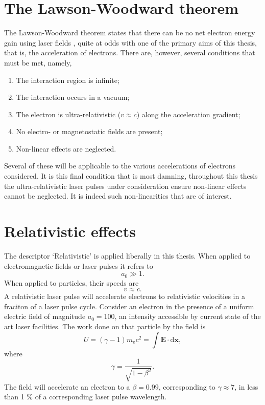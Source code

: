 \section{The Lawson-Woodward theorem}\label{sec:intro-lawson_woodward}
The Lawson-Woodward theorem states that there can be no net electron energy gain using laser fields \cite{esarey_2009_PhysicsLaserdrivenPlasmabaseda}, quite at odds with one of the primary aims of this thesis, that is, the acceleration of electrons. There are, however, several conditions that must be met, namely,
\begin{enumerate}
	\item The interaction region is infinite;
	\item The interaction  occurs in a vacuum;
	\item The electron is ultra-relativistic ($v\approx c$) along the acceleration gradient;
	\item No electro- or magnetostatic fields are present;
	\item Non-linear effects are neglected.
\end{enumerate}
Several of these will be applicable to the various accelerations of electrons considered. It is this final condition that is most damning, throughout this thesis the ultra-relativistic laser pulses under consideration ensure non-linear effects cannot be neglected. It is indeed such non-linearities that are of interest.

\section{Relativistic effects}
The descriptor `Relativistic' is applied liberally in this thesis. When applied to electromagnetic fields or laser pulses it refers to 
\begin{equation}
	a_0 \gg 1.
\end{equation}
When applied to particles, their speeds are
\begin{equation}
	v \approx c.
\end{equation}
A relativistic laser pulse will accelerate electrons to relativistic velocities in a fraciton of a laser pulse cycle. Consider an electron in the presence of a uniform electric field of magnitude $a_0 = 100$, an intensity accessible by current state of the art laser facilities. The work done on that particle by the field is 
\begin{equation}
	U = (\gamma -1)m_\mathrm{e}c^2 = \int \mathbf{E}\cdot \mathrm{d} \mathbf{x},
\end{equation}
where 
\begin{equation}
	\gamma = \frac{1}{\sqrt{1-\beta^2}}.
\end{equation}
The field will accelerate an electron to a $\beta = 0.99$, corresponding to $\gamma \approx 7$, in less than 1 \% of a corresponding laser pulse wavelength.

